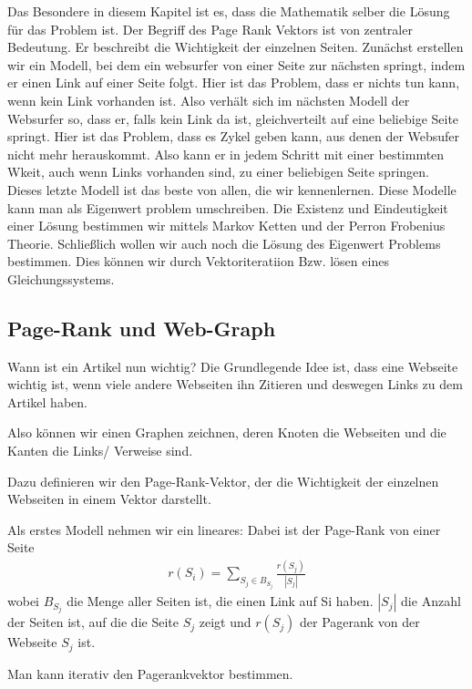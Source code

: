 \documentclass[]{article}
\begin{document}
Das Besondere in diesem Kapitel ist es, dass die Mathematik selber die Lösung für das Problem ist. 
Der Begriff des Page Rank Vektors ist von zentraler Bedeutung. Er beschreibt die Wichtigkeit der einzelnen Seiten. 
Zunächst erstellen wir ein Modell, bei dem ein websurfer von einer Seite zur nächsten springt, indem er einen Link auf einer Seite folgt. Hier ist das Problem, dass er nichts tun kann, wenn kein Link vorhanden ist. Also verhält sich im nächsten Modell der Websurfer so, dass er, falls kein Link da ist, gleichverteilt auf eine beliebige Seite springt. Hier ist das Problem, dass es Zykel geben kann, aus denen der Websufer nicht mehr herauskommt. Also kann er in jedem Schritt mit einer bestimmten Wkeit, auch wenn Links vorhanden sind, zu einer beliebigen Seite springen. Dieses letzte Modell ist das beste von allen, die wir kennenlernen. 
Diese Modelle kann man als Eigenwert problem umschreiben. Die Existenz und Eindeutigkeit einer Lösung bestimmen wir mittels Markov Ketten und der Perron Frobenius Theorie. 
Schließlich wollen wir auch noch die Lösung des Eigenwert Problems bestimmen. Dies können wir durch Vektoriteratiion Bzw. lösen eines Gleichungssystems.      

\subsection{Page-Rank und Web-Graph}

Wann ist ein Artikel nun wichtig? Die Grundlegende Idee ist, dass eine Webseite wichtig ist, wenn viele andere Webseiten ihn Zitieren und deswegen Links zu dem Artikel haben. 

Also können wir einen Graphen zeichnen, deren Knoten die Webseiten und die Kanten die Links/ Verweise sind. 

 Dazu definieren wir den Page-Rank-Vektor, der die Wichtigkeit der einzelnen Webseiten in einem Vektor darstellt. 
 
 Als erstes Modell nehmen wir ein lineares: Dabei ist der Page-Rank von einer Seite 
 \begin{align}
 \label{PRV}
 	r(S_i)= \sum\limits_{S_j \in B_{S_j}} \frac{r(S_j)}{|S_j|}
 \end{align} 
wobei $B_{S_j}$ die Menge aller Seiten ist, die einen Link auf Si haben. $|S_j|$ die Anzahl der Seiten ist, auf die die Seite $S_j$ zeigt und $r(S_j)$ der Pagerank von der Webseite $S_j$ ist.

Man kann iterativ den Pagerankvektor bestimmen. \\
\end{document}
